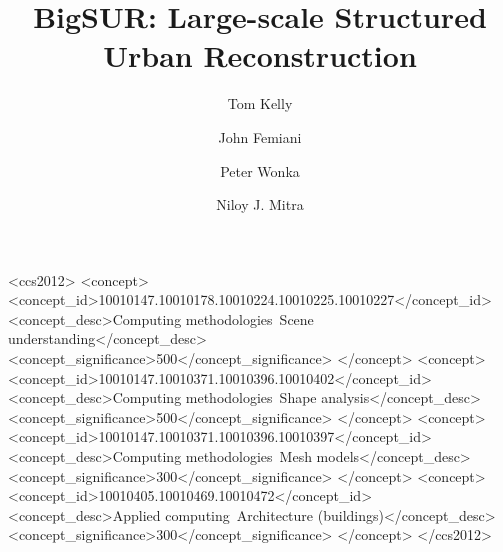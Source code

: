 \documentclass[acmtog]{acmart}
\title{BigSUR: Large-scale Structured Urban Reconstruction}
\author{Tom Kelly}
\affiliation{%
 \institution{University College London}
 \country{UK}
 }
\author{John Femiani}
\affiliation{
 \institution{Miami University}
 \country{USA}
 }
\author{Peter Wonka}
\affiliation{
 \institution{KAUST}
 \country{KSA}
 }
\author{Niloy J. Mitra}
\affiliation{
 \institution{University College London}
 \country{UK}
 }
\newcommand{\facades}{fa\c{c}ades\xspace}
\newcommand{\streetI}{street-level imagery\xspace}
\newcommand{\GISds}{GIS footprints\xspace}
\begin{document}
 

\graphicspath{{../images/megafacades/}}

 
 \begin{teaserfigure}
 \centering
   \hspace*{-.02\textwidth}  
   \def\svgwidth{1.02\textwidth}  
    
   \caption{{\it Structured Urban Reconstruction.} 
    Given \streetI, \GISds, and a coarse 3D mesh (left), we formulate a global optimization to automatically fuse these noisy, incomplete, and conflicting data sources to create 
   building footprints (middle: colored horizontal polygons) with profiles (vertical ribbons shown for several footprints) and attached building \facades  ~(vertical rectangles). The output encodes a structured  urban model~(right) including the walls, roof, and associated building elements (e.g., windows, balconies, roof, wall color, etc.). 
   Inset below: A reference aerial image. 
   }
   \label{fig:teaser}
\end{teaserfigure}




%
%
\begin{CCSXML}
<ccs2012>
<concept>
<concept_id>10010147.10010178.10010224.10010225.10010227</concept_id>
<concept_desc>Computing methodologies~Scene understanding</concept_desc>
<concept_significance>500</concept_significance>
</concept>
<concept>
<concept_id>10010147.10010371.10010396.10010402</concept_id>
<concept_desc>Computing methodologies~Shape analysis</concept_desc>
<concept_significance>500</concept_significance>
</concept>
<concept>
<concept_id>10010147.10010371.10010396.10010397</concept_id>
<concept_desc>Computing methodologies~Mesh models</concept_desc>
<concept_significance>300</concept_significance>
</concept>
<concept>
<concept_id>10010405.10010469.10010472</concept_id>
<concept_desc>Applied computing~Architecture (buildings)</concept_desc>
<concept_significance>300</concept_significance>
</concept>
</ccs2012>

\end{CCSXML}
\end{document}
